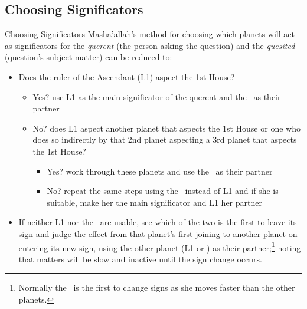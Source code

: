 \subsection{Choosing Significators}
\begin{frame}[t]{Choosing Significators}
Masha'allah's method for choosing which planets will act as significators for the \textsl{querent} (the person asking the question) and the \textsl{quesited} (question's subject matter) can be reduced to:
\begin{itemize}
\item Does the ruler of the Ascendant (L1) aspect the 1st House?
	\begin{itemize}
		\item Yes? use L1 as the main significator of the querent and the \Moon\ as their partner
		\item No? does L1 aspect another planet that aspects the 1st House or one who does so indirectly by that 2nd planet aspecting a 3rd planet that aspects the 1st House?
			\begin{itemize}
				\item Yes? work through these planets and use the \Moon\ as their partner
				\item No? repeat the same steps using the \Moon\ instead of L1 and if she is suitable, make her the main significator and L1 her partner
			\end{itemize}
	\end{itemize}
\item If neither L1 nor the \Moon\ are usable, see which of the two is the first to leave its sign and judge the effect from that planet's first joining to another planet on entering its new sign, using the other planet (L1 or \Moon) as their partner;\footnote{Normally the \Moon\ is the first to change signs as she moves faster than the other planets.} noting that matters will be slow and inactive until the sign change occurs.
\end{itemize}

\end{frame}
